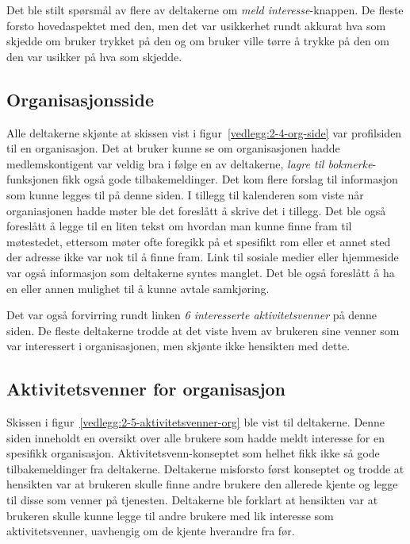 Det ble stilt spørsmål av flere av deltakerne om {\em  meld interesse}-knappen. De fleste forsto hovedaspektet med den, men det var usikkerhet rundt akkurat hva som skjedde om bruker trykket på den og om bruker ville tørre å trykke på den om den var usikker på hva som skjedde.


\subsection{Organisasjonsside}

Alle deltakerne skjønte at skissen vist i figur~\ref{vedlegg:2-4-org-side} var profilsiden til en organisasjon. Det at bruker kunne se om organisasjonen hadde medlemskontigent var veldig bra i følge en av deltakerne, {\em  lagre til bokmerke}-funksjonen fikk også gode tilbakemeldinger. Det kom flere forslag til informasjon som kunne legges til på denne siden. I tillegg til kalenderen som viste når organiasjonen hadde møter ble det foreslått å skrive det i tillegg. Det ble også foreslått å legge til en liten tekst om hvordan man kunne finne fram til møtestedet, ettersom møter ofte foregikk på et spesifikt rom eller et annet sted der adresse ikke var nok til å finne fram. Link til sosiale medier eller hjemmeside var også informasjon som deltakerne syntes manglet. Det ble også foreslått å ha en eller annen mulighet til å kunne avtale samkjøring.

Det var også forvirring rundt linken {\em  6 interesserte aktivitetsvenner} på denne siden. De fleste deltakerne trodde at det viste hvem av brukeren sine venner som var interessert i organisasjonen, men skjønte ikke hensikten med dette.


\subsection{Aktivitetsvenner for organisasjon}

Skissen i figur~\ref{vedlegg:2-5-aktivitetsvenner-org} ble vist til deltakerne. Denne siden inneholdt en oversikt over alle brukere som hadde meldt interesse for en spesifikk organisasjon. Aktivitetsvenn-konseptet som helhet fikk ikke så gode tilbakemeldinger fra deltakerne. Deltakerne misforsto først konseptet og trodde at hensikten var at brukeren skulle finne andre brukere den allerede kjente og legge til disse som venner på tjenesten. Deltakerne ble forklart at hensikten var at brukeren skulle kunne legge til andre brukere med lik interesse som aktivitetsvenner, uavhengig om de kjente hverandre fra før. 

